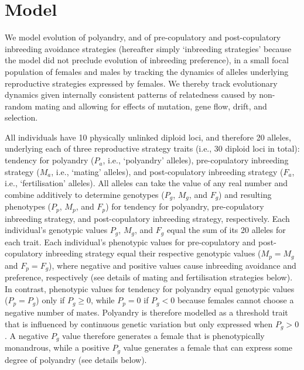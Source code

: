 \documentclass[10pt,letterpaper]{article}
\begin{document}
\section*{Model}

We model evolution of polyandry, and of pre-copulatory and post-copulatory inbreeding avoidance strategies (hereafter simply `inbreeding strategies' because the model did not preclude evolution of inbreeding preference), in a small focal population of females and males by tracking the dynamics of alleles underlying reproductive strategies expressed by females. We thereby track evolutionary dynamics given internally consistent patterns of relatedness caused by non-random mating and allowing for effects of mutation, gene flow, drift, and selection. 

All individuals have 10 physically unlinked diploid loci, and therefore 20 alleles, underlying each of three reproductive strategy traits (i.e., 30 diploid loci in total): tendency for polyandry ($P_{a}$, i.e., `polyandry' alleles), pre-copulatory inbreeding strategy ($M_{a}$, i.e., `mating' alleles), and post-copulatory inbreeding strategy ($F_{a}$, i.e., `fertilisation' alleles). All alleles can take the value of any real number \cite[i.e., a continuum-of-alleles model;][]{Kimura1965, Lande1976, Reeve2000, Bocedi2014} and combine additively to determine genotypes ($P_{g}$, $M_{g}$, and $F_{g}$) and resulting phenotypes ($P_{p}$, $M_{p}$, and $F_{p}$) for tendency for polyandry, pre-copulatory inbreeding strategy, and post-copulatory inbreeding strategy, respectively. Each individual's genotypic values $P_{g}$, $M_{g}$, and $F_{g}$ equal the sum of its 20 alleles for each trait. Each individual's phenotypic values for pre-copulatory and post-copulatory inbreeding strategy equal their respective genotypic values ($M_{p} = M_{g}$ and $F_{p} = F_{g}$), where negative and positive values cause inbreeding avoidance and preference, respectively (see details of mating and fertilisation strategies below). In contrast, phenotypic values for tendency for polyandry equal genotypic values ($P_{p} = P_{g}$) only if $P_{g} \geq 0$, while $P_{p} = 0$ if $P_{g} < 0$ because females cannot choose a negative number of mates. Polyandry is therefore modelled as a threshold trait \cite[][]{Lynch1998, Roff1996, Roff1998, Duthie} that is influenced by continuous genetic variation but only expressed when $P_{g} > 0$. A negative $P_{g}$ value therefore generates a female that is phenotypically monandrous, while a positive $P_{g}$ value generates a female that can express some degree of polyandry (see details below).
\end{document}
